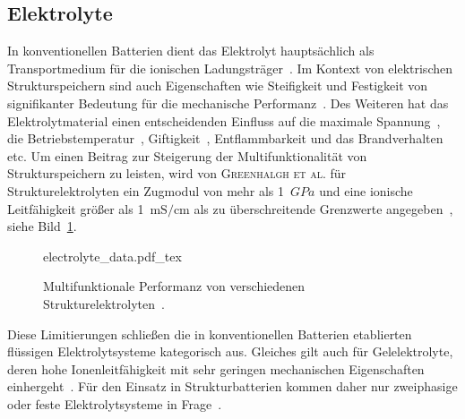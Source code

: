 \subsection{Elektrolyte}
In konventionellen Batterien dient das Elektrolyt hauptsächlich als Transportmedium für die ionischen Ladungsträger~\cite{Gerlach2020}. Im Kontext von elektrischen Strukturspeichern sind auch Eigenschaften wie Steifigkeit und Festigkeit von signifikanter Bedeutung für die mechanische Performanz~\cite{Greenhalgh2023}. Des Weiteren hat das Elektrolytmaterial einen entscheidenden Einfluss auf die maximale Spannung~\cite{Xu2016}, die Betriebstemperatur~\cite{Chen2022a}, Giftigkeit~\cite{Beard2019}, Entflammbarkeit und das Brandverhalten~\cite{Roth2012} etc. Um einen Beitrag zur Steigerung der Multifunktionalität von Strukturspeichern zu leisten, wird von \textsc{Greenhalgh et al.} für Strukturelektrolyten ein Zugmodul von mehr als 1~$\si{GPa}$ und eine ionische Leitfähigkeit größer als 1~$\si{\milli \siemens \per \cm}$ als zu überschreitende Grenzwerte angegeben~\cite{Greenhalgh2023}, siehe Bild~\ref{fig:electrolyte_data}.
\begin{figure}[ht]
        \center
		{electrolyte_data.pdf_tex}
		\caption{\label{fig:electrolyte_data}Multifunktionale Performanz von verschiedenen Strukturelektrolyten~\cite{Greenhalgh2023}.}
\end{figure}
Diese Limitierungen schließen die in konventionellen Batterien etablierten flüssigen Elektrolytsysteme kategorisch aus. Gleiches gilt auch für Gelelektrolyte, deren hohe Ionenleitfähigkeit mit sehr geringen mechanischen Eigenschaften einhergeht~\cite{Gayet2009, Li2018, Zhao2020a}. Für den Einsatz in Strukturbatterien kommen daher nur zweiphasige oder feste Elektrolytsysteme in Frage~\cite{Greenhalgh2023}.

